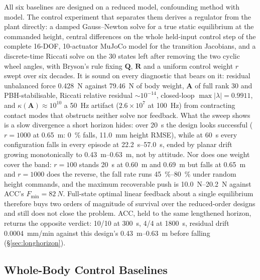 \documentclass{jcd}
\begin{document}
All six baselines are designed on a reduced model, confounding method with
model. The control experiment that separates them derives a regulator from the
plant directly: a damped Gauss--Newton solve for
a true static equilibrium at the commanded height, central differences on the
whole held-input control step of the complete 16-DOF, 10-actuator MuJoCo model
for the transition Jacobians, and a discrete-time Riccati solve on the \num{30}
states left after removing the two cyclic wheel angles, with Bryson's rule
fixing $\mathbf{Q}$, $\mathbf{R}$ and a uniform control weight $r$ swept over six
decades. It is sound on every diagnostic that bears on it: residual unbalanced force \SI{0.428}{N} against \SI{79.46}{N} of body weight, $\mathbf{A}$ of full
rank \num{30} and PBH-stabilisable, Riccati relative residual ${\sim}10^{-14}$,
closed-loop $\max|\lambda|{=}0.9911$, and $\kappa(\mathbf{A}){\approx}10^{10}$ a
\SI{50}{Hz} artifact ($2.6{\times}10^{7}$ at \SI{100}{Hz}) from contracting
contact modes that obstructs neither solve nor feedback. What the sweep shows is
a slow divergence a short horizon hides: over \SI{20}{s} the design looks
successful ($r{=}1000$ at \SI{0.65}{m}: \SI{0}{\percent} falls, \SI{11.0}{mm}
height RMSE), while at \SI{60}{s} every configuration falls in every episode at
\SIrange{22.2}{57.0}{s}, ended by planar drift growing monotonically to
\SIrange{0.43}{0.63}{m}, not by attitude. Nor does one weight cover the band:
$r{=}100$ stands \SI{20}{s} at \SI{0.60}{m} and \SI{0.69}{m} but falls at
\SI{0.65}{m} and $r{=}1000$ does the reverse, the fall rate runs
\SIrange{45}{80}{\percent} under random height commands, and the maximum
recoverable push is \SIrange{10.0}{20.2}{N} against ACC's
$F_{\min}{=}\SI{82}{N}$. Full-state optimal linear feedback about a single
equilibrium therefore buys two orders of magnitude of survival over the
reduced-order designs and still does not close the problem. ACC, held to the same lengthened horizon, returns the opposite verdict: \num{10}/\num{10} at \SI{300}{s}, \num{4}/\num{4} at \SI{1800}{s},
residual drift \SI{0.0004}{mm/min} against this design's
\SIrange{0.43}{0.63}{m} before falling (\S\ref{sec:longhorizon}).

\subsection{Whole-Body Control Baselines}
\label{sec:wbc}
\end{document}
